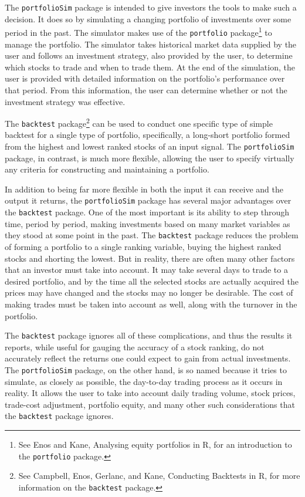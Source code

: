 \documentclass{article}
\begin{document}
The \texttt{portfolioSim} package is intended to give investors the
tools to make such a decision.  It does so by simulating a changing
portfolio of investments over some period in the past.  The simulator
makes use of the \texttt{portfolio} package\footnote{See Enos and
Kane, Analysing equity portfolios in R, for an introduction to the
\texttt{portfolio} package.} to manage the portfolio.  The simulator
takes historical market data supplied by the user and follows an
investment strategy, also provided by the user, to determine which
stocks to trade and when to trade them.  At the end of the simulation,
the user is provided with detailed information on the portfolio's
performance over that period.  From this information, the user can
determine whether or not the investment strategy was effective.

The \texttt{backtest} package\footnote{See Campbell, Enos, Gerlanc,
and Kane, Conducting Backtests in R, for more information on the
\texttt{backtest} package.} can be used to conduct one specific type
of simple backtest for a single type of portfolio, specifically, a
long-short portfolio formed from the highest and lowest ranked stocks
of an input signal.  The \texttt{portfolioSim} package, in contrast,
is much more flexible, allowing the user to specify virtually any
criteria for constructing and maintaining a portfolio.

In addition to being far more flexible in both the input it can
receive and the output it returns, the \texttt{portfolioSim} package
has several major advantages over the \texttt{backtest} package.  One
of the most important is its ability to step through time, period by
period, making investments based on many market variables as they
stood at some point in the past.  The \texttt{backtest} package
reduces the problem of forming a portfolio to a single ranking
variable, buying the highest ranked stocks and shorting the lowest.
But in reality, there are often many other factors that an investor
must take into account.  It may take several days to trade to a
desired portfolio, and by the time all the selected stocks are
actually acquired the prices may have changed and the stocks may no
longer be desirable.  The cost of making trades must be taken into
account as well, along with the turnover in the portfolio.

The \texttt{backtest} package ignores all of these complications, and
thus the results it reports, while useful for gauging the accuracy of
a stock ranking, do not accurately reflect the returns one could
expect to gain from actual investments.  The \texttt{portfolioSim}
package, on the other hand, is so named because it tries to simulate,
as closely as possible, the day-to-day trading process as it occurs in
reality.  It allows the user to take into account daily trading
volume, stock prices, trade-cost adjustment, portfolio equity, and
many other such considerations that the \texttt{backtest} package
ignores.
\end{document}
